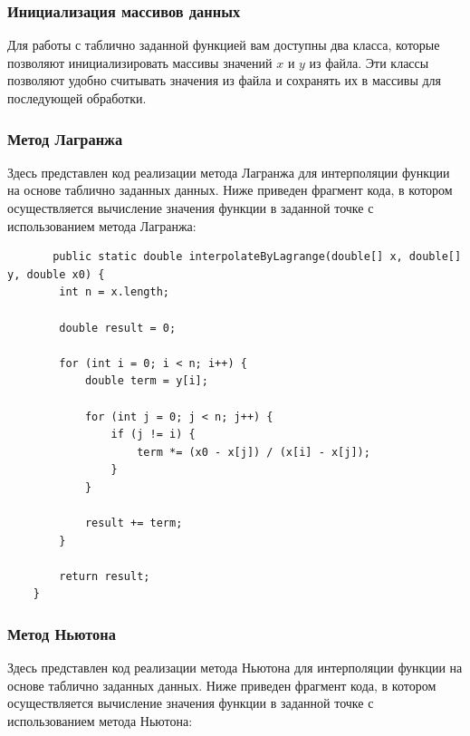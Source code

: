 \documentclass[12pt]{article}
\begin{document}
\subsubsection{Инициализация массивов данных}

Для работы с таблично заданной функцией вам доступны два класса, которые позволяют инициализировать массивы значений $x$ и $y$ из файла. Эти классы позволяют удобно считывать значения из файла и сохранять их в массивы для последующей обработки.



\subsubsection{Метод Лагранжа}
Здесь представлен код реализации метода Лагранжа для интерполяции функции на основе таблично заданных данных. Ниже приведен фрагмент кода, в котором осуществляется вычисление значения функции в заданной точке с использованием метода Лагранжа:

\begin{verbatim}
       public static double interpolateByLagrange(double[] x, double[] y, double x0) {
        int n = x.length;

        double result = 0;

        for (int i = 0; i < n; i++) {
            double term = y[i];

            for (int j = 0; j < n; j++) {
                if (j != i) {
                    term *= (x0 - x[j]) / (x[i] - x[j]);
                }
            }

            result += term;
        }

        return result;
    }
\end{verbatim}

\subsubsection{Метод Ньютона}

Здесь представлен код реализации метода Ньютона для интерполяции функции на основе таблично заданных данных. Ниже приведен фрагмент кода, в котором осуществляется вычисление значения функции в заданной точке с использованием метода Ньютона:
\end{document}
